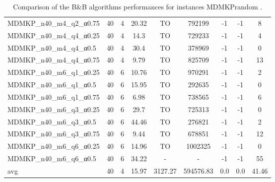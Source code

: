 \begin{table}[!ht]
{\begin{tabular}{lcccccccc}
MDMKP\_n40\_m4\_q2\_α0.75 & 40 & 4 &  \textcolor{blue2}{20.32} & TO & 792199 & -1 & -1 & 8 \\
MDMKP\_n40\_m4\_q4\_α0.25 & 40 & 4 &  \textcolor{blue2}{14.3} & TO & 729233 & -1 & -1 & 4 \\
MDMKP\_n40\_m4\_q4\_α0.5 & 40 & 4 &  \textcolor{blue2}{30.4} & TO & 378969 & -1 & -1 & 0 \\
MDMKP\_n40\_m4\_q4\_α0.75 & 40 & 4 &  \textcolor{blue2}{9.79} & TO & 825709 & -1 & -1 & 13 \\
MDMKP\_n40\_m6\_q1\_α0.25 & 40 & 6 &  \textcolor{blue2}{10.76} & TO & 970291 & -1 & -1 & 2 \\
MDMKP\_n40\_m6\_q1\_α0.5 & 40 & 6 &  \textcolor{blue2}{15.95} & TO & 292635 & -1 & -1 & 0 \\
MDMKP\_n40\_m6\_q1\_α0.75 & 40 & 6 &  \textcolor{blue2}{6.98} & TO & 738565 & -1 & -1 & 6 \\
MDMKP\_n40\_m6\_q3\_α0.25 & 40 & 6 &  \textcolor{blue2}{29.7} & TO & 725313 & -1 & -1 & 0 \\
MDMKP\_n40\_m6\_q3\_α0.5 & 40 & 6 &  \textcolor{blue2}{44.46} & TO & 276821 & -1 & -1 & 2 \\
MDMKP\_n40\_m6\_q3\_α0.75 & 40 & 6 &  \textcolor{blue2}{9.44} & TO & 678851 & -1 & -1 & 12 \\
MDMKP\_n40\_m6\_q6\_α0.25 & 40 & 6 &  \textcolor{blue2}{14.96} & TO & 1002325 & -1 & -1 & 0 \\
MDMKP\_n40\_m6\_q6\_α0.5 & 40 & 6 &  \textcolor{blue2}{34.22} &  - &  - & -1 & -1 & 55 \\
\cline{1-9} avg & 40 & 4 & 15.97 & 3127.27& 594576.83 & 0.0& 0.0 & 41.46\\ \cline{1-9}
\bottomrule
\end{tabular}
}%
\caption{Comparison of the B\&B algorithms performances for instances MDMKPrandom .}
\label{tab:table_EPSILONvsBBvsEPBBB_MDMKPrandom }
\end{table}
